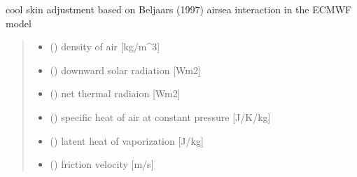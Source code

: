 \documentclass[letterpaper,10pt,english]{sphinxmanual}
\begin{document}
\begin{fulllineitems}
\label{\detokenize{users_guide:cs_wl_subs.cs_Beljaars}}
\pysigstartsignatures
{}
\pysigstopsignatures
\sphinxAtStartPar
cool skin adjustment based on Beljaars (1997)
air\sphinxhyphen{}sea interaction in the ECMWF model
\begin{quote}\begin{description}
\begin{itemize}
\item {} 
\sphinxAtStartPar
{} () \textendash{} density of air           {[}kg/m\textasciicircum{}3{]}

\item {} 
\sphinxAtStartPar
{} () \textendash{} downward solar radiation {[}Wm\sphinxhyphen{}2{]}

\item {} 
\sphinxAtStartPar
{} () \textendash{} net thermal radiaion     {[}Wm\sphinxhyphen{}2{]}

\item {} 
\sphinxAtStartPar
{} () \textendash{} specific heat of air at constant pressure {[}J/K/kg{]}

\item {} 
\sphinxAtStartPar
{} () \textendash{} latent heat of vaporization   {[}J/kg{]}

\item {} 
\sphinxAtStartPar
{} () \textendash{} friction velocity         {[}m/s{]}


\end{itemize}
\end{description}
\end{quote}
\end{fulllineitems}
\end{document}
